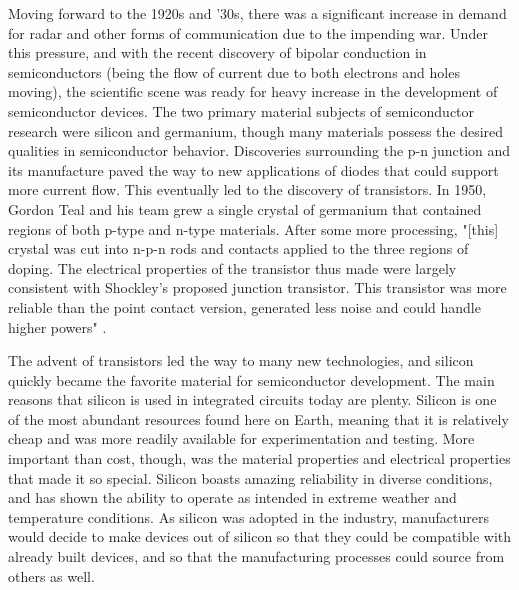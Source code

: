 \documentclass[12pt]{article}
\begin{document}
\begin{flushleft}
Moving forward to the 1920s and '30s, there was a significant
increase in demand for radar and other forms of communication
due to the impending war. Under this pressure, and
with the recent discovery of bipolar conduction in
semiconductors (being the flow of current due to both
electrons and holes moving), the scientific scene was
ready for heavy increase in the development of semiconductor
devices. The two primary material subjects of semiconductor
research were silicon and germanium, though many materials
possess the desired qualities in semiconductor behavior.
Discoveries surrounding the p-n junction and its manufacture
paved the way to new applications of diodes that could
support more current flow. This eventually led to the
discovery of transistors. In 1950, Gordon Teal and
his team grew a single crystal of germanium that contained
regions of both p-type and n-type materials. After some
more processing, "[this] crystal was cut into n-p-n rods and contacts applied to the three regions
of doping. The electrical properties of the
transistor thus made were largely consistent with
Shockley's proposed junction transistor. This
transistor was more reliable than the point contact
version, generated less noise and could handle
higher powers" \parencite{TudorJenkins_2005}.

The advent of transistors led the way to many new technologies,
and silicon quickly became the favorite material for
semiconductor development. The main reasons that silicon
is used in integrated circuits today are plenty. Silicon
is one of the most abundant resources found here on
Earth, meaning that it is relatively cheap and was
more readily available for experimentation and testing.
More important than cost, though, was the material
properties and electrical properties that made it so
special. Silicon boasts amazing reliability in diverse
conditions, and has shown the ability to operate as
intended in extreme weather and temperature conditions.
As silicon was adopted in the industry, manufacturers
would decide to make devices out of silicon so that
they could be compatible with already built devices,
and so that the manufacturing processes could source
from others as well.


\end{flushleft}
\end{document}
